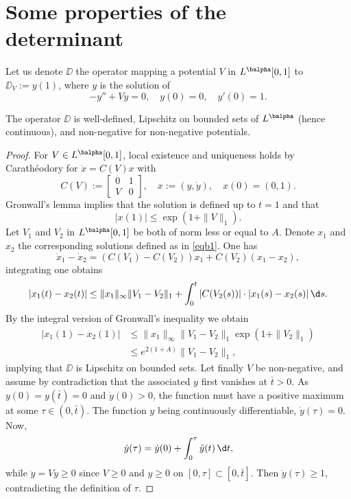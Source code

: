 \section{Some properties of the determinant}\label{s2}
Let us denote $\DD$ the operator mapping a potential $V$ in $L^{\balpha}[0,1]$ to
$\DD_V := y(1)$, where $y$ is the solution of
\[
-y''+Vy=0,\quad y(0)=0, \quad y'(0)=1.
\]

\begin{prop} \label{prop10} The operator $\DD$
is well-defined, Lipschitz on bounded sets of $L^{\balpha}$ (hence continuous), and
non-negative for non-negative potentials.
\end{prop}

\begin{proof} For $V \in L^{\balpha}[0,1]$,
local existence and uniqueness holds by Carathéodory for $\dot{x}=C(V)x$ with
\begin{equation} \label{eqb1}
C(V) := \begin{bmatrix}
0 & 1\\
V & 0 \end{bmatrix},\quad x:=(y,\dot{y}),\quad x(0)=(0,1).
\end{equation}
Gronwall's lemma implies that the solution is defined up to $t=1$ and that
\begin{equation} \label{eqb3}
|x(1)| \leq \exp(1+\|V\|_1).
\end{equation}
Let $V_1$ and $V_2$ in $L^{\balpha}[0,1]$ be both of norm less or equal to $A$.
Denote $x_1$ and $x_2$ the corresponding solutions defined as in \eqref{eqb1}. One has
\[
\dot{x}_1-\dot{x}_2 = (C(V_1)-C(V_2))x_1 + C(V_2)(x_1-x_2),
\]
integrating one obtains
\[
|x_1(t)-x_2(t)| \leq \|x_1\|_\infty \|V_1-V_2\|_1
+ \int_0^t |C(V_2(s))|\cdot|x_1(s)-x_2(s)|\,\d s.
\]
By the integral version of Gronwall's inequality we obtain
\begin{align*}
|x_1(1)-x_2(1)| & \leq \|x_1\|_\infty \|V_1-V_2\|_1 \exp(1+\|V_2\|_1) \\
& \leq e^{2(1+A)} \|V_1-V_2\|_1,
\end{align*}
implying that $\DD$ is Lipschitz on bounded sets.
Let finally $V$ be non-negative, and assume by contradiction
that the associated $y$ first vanishes at $\bar{t} > 0$.
As \hbox{$y(0)=y(\bar{t})=0$} and $\dot{y}(0)>0$,
the function must have a positive maximum at some $\tau \in (0,\bar{t})$.
The function $y$ being
continuously differentiable, $\dot{y}(\tau)=0$. Now,
\[
\dot{y}(\tau) = \dot{y}(0)+\int_0^{\tau}\ddot{y}(t)\,\d t,
\]
while $\ddot{y}=Vy \geq 0$ since $V \geq 0$ and $y \geq 0$ on $[0,\tau] \subset
[0,\bar{t}]$. Then $\dot{y}(\tau) \geq 1$, contradicting the definition of
$\tau$.\end{proof}

